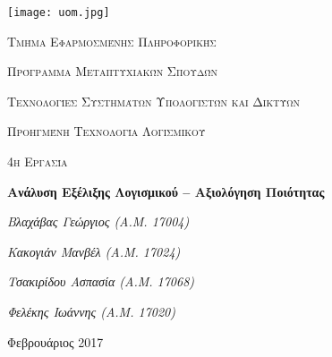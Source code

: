 \begin{titlepage}
	\centering
	\texttt{[image: uom.jpg]}\par\vspace{1cm}
	{\scshape\Large Τμήμα Εφαρμοσμένης Πληροφορικής\par}
	\vspace{1em}
	{\scshape\Large Πρόγραμμα Μεταπτυχιακών Σπουδών\par}
	\vspace{1em}
	{\scshape\Large Τεχνολογίες Συστημάτων Υπολογιστών και Δικτύων\par}
	\vspace{1cm}
	{\scshape\LARGE Προηγμένη Τεχνολογία Λογισμικού\par}
	\vspace{1.5cm}
	{\scshape\Large 4η Εργασία\par}
	{\huge\bfseries Ανάλυση Εξέλιξης Λογισμικού – Αξιολόγηση Ποιότητας \par}
	\vspace{3cm}
	{\Large\itshape Βλαχάβας Γεώργιος (Α.Μ. 17004) \par}
	\vspace{1em}
	{\Large\itshape Κακογιάν Μανβέλ (Α.Μ. 17024) \par}
	\vspace{1em}
	{\Large\itshape Τσακιρίδου Ασπασία (Α.Μ. 17068) \par}
	\vspace{1em}
	{\Large\itshape Φελέκης Ιωάννης	(Α.Μ. 17020) \par}
	\vfill

	{\large Φεβρουάριος 2017\par}
\end{titlepage}
